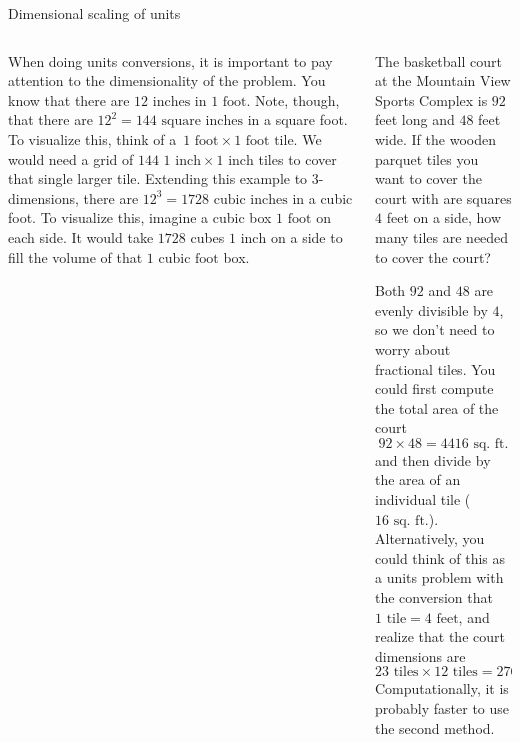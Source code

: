 \documentclass[9pt,aspectratio=169]{beamer}
\begin{document}
\begin{frame}{Dimensional scaling of units}
  \begin{columns}[T]
    \begin{column}{0.5\textwidth}
      When doing units conversions, it is important to pay attention to the dimensionality of the problem.  You know that there are $12 \text{ inches}$ in $1 \text{ foot}$.  Note, though, that there are $12^2 = 144 \text{ square inches}$ in a square foot.  To visualize this, think of a~$1 \text{ foot} \times 1 \text{ foot tile}$.  We would need a grid of $144$ $1 \text{ inch} \times 1 \text{ inch}$ tiles to cover that single larger tile.  Extending this example to 3-dimensions, there are $12^3 = 1728 \text{ cubic inches}$ in a cubic foot.  To visualize this, imagine a cubic box $1 \text{ foot}$ on each side.  It would take $1728$ cubes $1 \text{ inch}$ on a side to fill the volume of that $1 \text{ cubic foot}$ box.
    \end{column}
    \begin{column}{0.5\textwidth}
      \begin{problem}
        The basketball court at the Mountain View Sports Complex is $92$ feet long and $48$ feet wide.  If the wooden parquet tiles you want to cover the court with are squares $4$ feet on a side, how many tiles are needed to cover the court?
      \end{problem}

      Both $92$ and $48$ are evenly divisible by $4$, so we don’t need to worry about fractional tiles.  You could first compute the total area of the court 
      \[92 \times 48 = 4416 \text{ sq. ft.}\]
      and then divide by the area of an individual tile ($16 \text{ sq. ft.}$).  Alternatively, you could think of this as a units problem with the conversion that $1 \text{ tile} = 4 \text{ feet}$, and realize that the court dimensions are 
      \[ 23 \text{ tiles} \times 12 \text{ tiles} = 276 \text{ sq. tiles}.\]  
      Computationally, it is probably faster to use the second method.
    \end{column}
  \end{columns}
\end{frame}
\end{document}
